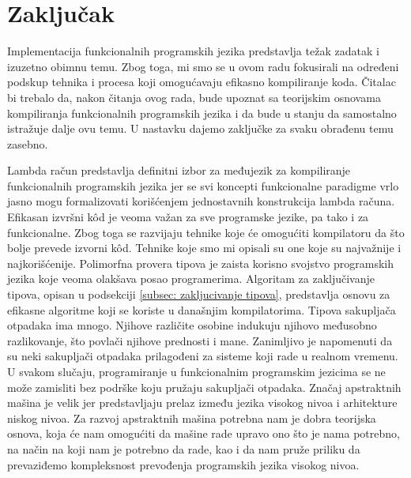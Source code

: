 \documentclass[a4paper]{article}
\begin{document}
\section{Zaključak}
\label{sec:zakljucak}

Implementacija funkcionalnih programskih jezika predstavlja težak zadatak i izuzetno obimnu temu. Zbog toga, mi smo se u ovom radu fokusirali na određeni podskup tehnika i procesa koji omogućavaju efikasno kompiliranje koda. Čitalac bi trebalo da, nakon čitanja ovog rada, bude upoznat sa teorijskim osnovama kompiliranja funkcionalnih programskih jezika i da bude u stanju da samostalno istražuje dalje ovu temu. U nastavku dajemo zaključke za svaku obrađenu temu zasebno.

Lambda račun predstavlja definitni izbor za međujezik za kompiliranje funkcionalnih programskih jezika jer se svi koncepti funkcionalne paradigme vrlo jasno mogu formalizovati korišćenjem jednostavnih konstrukcija lambda računa. Efikasan izvršni k\^od je veoma važan za sve programske jezike, pa tako i za funkcionalne. Zbog toga se razvijaju tehnike koje će omogućiti kompilatoru da što bolje prevede izvorni k\^od. Tehnike koje smo mi opisali su one koje su najvažnije i najkorišćenije. Polimorfna provera tipova je zaista korisno svojstvo programskih jezika koje veoma olakšava posao programerima. Algoritam za zaključivanje tipova, opisan u podsekciji \ref{subsec: zakljucivanje tipova}, predstavlja osnovu za efikasne algoritme koji se koriste u današnjim kompilatorima. Tipova sakupljača otpadaka ima mnogo. Njihove različite osobine indukuju njihovo međusobno razlikovanje, što povlači njihove prednosti i mane. Zanimljivo je napomenuti da su neki sakupljači otpadaka prilagođeni za sisteme koji rade u realnom vremenu. U svakom slučaju, programiranje u funkcionalnim programskim jezicima se ne može zamisliti bez podrške koju pružaju sakupljači otpadaka. Značaj apstraktnih mašina je velik jer predstavljaju prelaz između jezika visokog nivoa i arhitekture niskog nivoa. Za razvoj apstraktnih mašina potrebna nam je dobra teorijska osnova, koja će nam omogućiti da mašine rade upravo ono što je nama potrebno, na način na koji nam je potrebno da rade, kao i da nam pruže priliku da prevaziđemo kompleksnost prevođenja programskih jezika visokog nivoa.


\appendix
 


\end{document}
